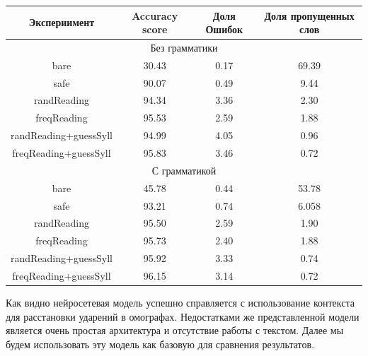 \documentclass[14pt, a4paper, russian]{report}
\begin{document}
\begin{normalsize}
\begin{table}[H]
	\begin{small}
		\begin{center}
			\begin{tabular}{|c|c|c|c|}
				\hline
				    Экспериимент      & Accuracy score & Доля Ошибок & Доля пропущенных слов \\ \hline
				\multicolumn{4}{|c|}{Без грамматики}                                         \\ \hline
				        bare          &     30.43      &    0.17     &         69.39         \\ \hline
				        safe          &     90.07      &    0.49     &         9.44          \\ \hline
				     randReading      &     94.34      &    3.36     &         2.30          \\ \hline
				     freqReading      &     95.53      &    2.59     &         1.88          \\ \hline
				randReading+guessSyll &     94.99      &    4.05     &         0.96          \\ \hline
				freqReading+guessSyll &     95.83      &    3.46     &         0.72          \\ \hline
				\multicolumn{4}{|c|}{С грамматикой}                                          \\ \hline
				        bare          &     45.78      &    0.44     &         53.78         \\ \hline
				        safe          &     93.21      &    0.74     &         6.058         \\ \hline
				     randReading      &     95.50      &    2.59     &         1.90          \\ \hline
				     freqReading      &     95.73      &    2.40     &         1.88          \\ \hline
				randReading+guessSyll &     95.92      &    3.33     &         0.74          \\ \hline
				freqReading+guessSyll &     96.15      &    3.14     &         0.72          \\ \hline
			\end{tabular}
		\end{center}
	\end{small}
	\label{table:base_homo}
\end{table}

Как видно нейросетевая модель успешно справляется с использование контекста для расстановки ударений в омографах. Недостатками же представленной модели является очень простая архитектура и отсутствие работы с текстом. Далее мы будем использовать эту модель как базовую для сравнения результатов. 



\end{normalsize}
\end{document}
